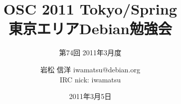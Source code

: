 




\documentclass[cjk,dvipdfmx,12pt]{beamer}
\usepackage{monthlypresentation}



\title{OSC 2011 Tokyo/Spring \\東京エリアDebian勉強会}
\subtitle{第74回 2011年3月度}
\author{岩松 信洋 iwamatsu@debian.org\\IRC nick: iwamatsu}
\date{2011年3月5日}



